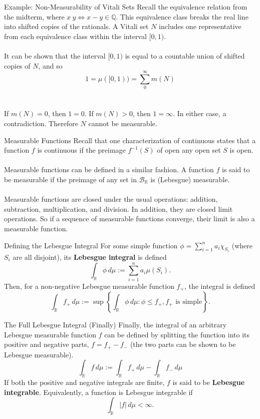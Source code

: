 \documentclass{beamer}
\begin{document}
\begin{frame}{Example: Non-Measurability of Vitali Sets}
Recall the equivalence relation from the midterm, where 
$x~y \iff x - y \in \mathbb{Q}$. This equivalence class
breaks the real line into shifted copies of the rationals.
A Vitali set $N$ includes one representative from each equivalence class within the interval
$[0,1)$.
\\~\\
It can be shown that the interval $[0,1)$ is equal to a countable
union of shifted copies of $N$, and so
\[
    1 = \mu([0,1)) = \sum_{0}^{\infty} m(N)
\]
\\~\\
If $m(N) = 0$, then $1=0$. If $m(N) > 0$, then $1=\infty$.
In either case, a contradiction. Therefore $N$ cannot be
measurable.

\end{frame}

\begin{frame}{Measurable Functions}
    Recall that one characterization of continuous states that a function
    $f$ is continuous if the preimage $f^{-1}(S)$ of open any open set $S$
    is open.
    \\~\\
    Measurable functions can be defined in a similar fashion. A function $f$
    is said to be measurable if the preimage of any set in $\mathcal{B}_\mathbb{R}$
    is (Lebesgue) measurable.
    \\~\\
    Measurable functions are closed under the usual operations: addition,
    subtraction, multiplication, and division. In addition, they are closed 
    limit operations. So if a sequence of measurable functions converge, their
    limit is also a measurable function.
\end{frame}

\begin{frame}{Defining the Lebesgue Integral}
    For some simple function $\phi = \sum_{i=1}^{n} a_i \chi_{S_i}$ (where
    $S_i$ are all disjoint), its \textbf{Lebesgue integral} is defined 
    \[
        \int_{\mathbb{R}}\phi\,d\mu := \sum_{i=1}^{n} a_i\mu(S_i).
    \]
    Then, for a non-negative Lebesgue measurable function $f_+$, the integral
    is defined
    \[
        \int_{\mathbb{R}}f_+\,d\mu := \sup \left\{\int_{\mathbb{R}} \phi\,d\mu : \phi \leq f_+, f_+ \text{ is simple}\right\}.
    \]
\end{frame}

\begin{frame}{The Full Lebesgue Integral (Finally)}
    Finally, the integral of an arbitrary Lebesgue measurable function $f$ can be defined
    by splitting the function into its positive and negative parts, $f = f_+ - f_-$ (the two
    parts can be shown to be Lebesgue measurable).
    \[
        \int_{\mathbb{R}}f\,d\mu := \int_{\mathbb{R}}f_+\,d\mu - \int_{\mathbb{R}}f_-\,d\mu  
    \]
    If both the positive and negative integrals are finite, $f$ is said to be \textbf{Lebesgue integrable}.
    Equivalently, a function is Lebesgue integrable if
    \[
        \int_{\mathbb{R}} |f|\,d\mu < \infty.  
    \]
\end{frame}
\end{document}
